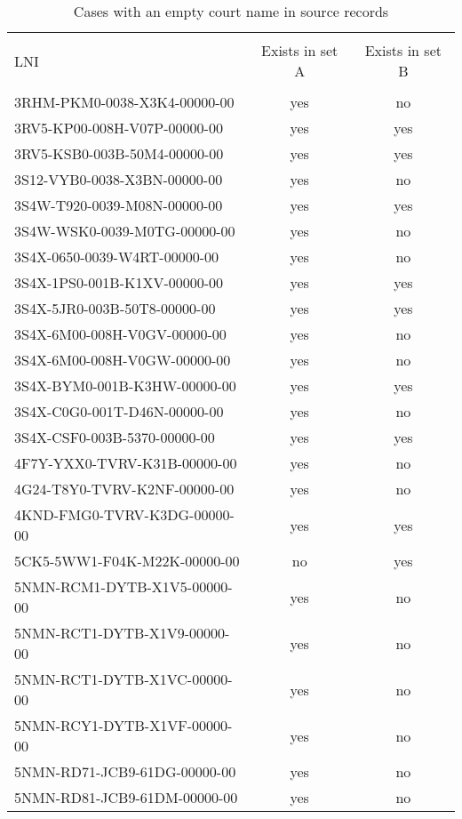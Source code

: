 \documentclass[10pt, letterpaper]{article}
\begin{document}
\begin{spacing}{1.0}
\begin{table}[H]
    \centering
    \caption{Cases with an empty court name in source records}
    \small
    \begin{tabular}{p{2.5in}cc}
        \hline\\[-6pt]
        LNI & Exists in set A & Exists in set B\\[4pt]
        \hline\\[-6pt]
        3RHM-PKM0-0038-X3K4-00000-00 & yes & no\\
        3RV5-KP00-008H-V07P-00000-00 & yes & yes\\
        3RV5-KSB0-003B-50M4-00000-00 & yes & yes\\
        3S12-VYB0-0038-X3BN-00000-00 & yes & no\\
        3S4W-T920-0039-M08N-00000-00 & yes & yes\\
        3S4W-WSK0-0039-M0TG-00000-00 & yes & no\\
        3S4X-0650-0039-W4RT-00000-00 & yes & no\\
        3S4X-1PS0-001B-K1XV-00000-00 & yes & yes\\
        3S4X-5JR0-003B-50T8-00000-00 & yes & yes\\
        3S4X-6M00-008H-V0GV-00000-00 & yes & no\\
        3S4X-6M00-008H-V0GW-00000-00 & yes & no\\
        3S4X-BYM0-001B-K3HW-00000-00 & yes & yes\\
        3S4X-C0G0-001T-D46N-00000-00 & yes & no\\
        3S4X-CSF0-003B-5370-00000-00 & yes & yes\\
        4F7Y-YXX0-TVRV-K31B-00000-00 & yes & no\\
        4G24-T8Y0-TVRV-K2NF-00000-00 & yes & no\\
        4KND-FMG0-TVRV-K3DG-00000-00 & yes & yes\\
        5CK5-5WW1-F04K-M22K-00000-00 & no & yes\\
        5NMN-RCM1-DYTB-X1V5-00000-00 & yes & no\\
        5NMN-RCT1-DYTB-X1V9-00000-00 & yes & no\\
        5NMN-RCT1-DYTB-X1VC-00000-00 & yes & no\\
        5NMN-RCY1-DYTB-X1VF-00000-00 & yes & no\\
        5NMN-RD71-JCB9-61DG-00000-00 & yes & no\\
        5NMN-RD81-JCB9-61DM-00000-00 & yes & no\\

\end{tabular}
\end{table}
\end{spacing}
\end{document}
